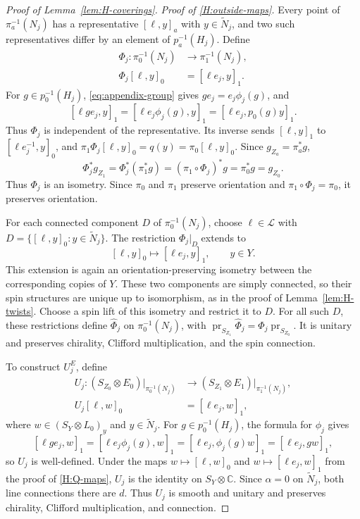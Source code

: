 \documentclass[12pt,reqno]{amsart}
\numberwithin{equation}{section}
\theoremstyle{definition}
\begin{document}
\begin{proof}[Proof of Lemma~\ref{lem:H-coverings}]
\emph{Proof of \ref{H:outside-maps}.}
Every point of $\pi_a^{-1}(N_j)$ has a representative
$[\ell,y]_a$ with $y\in\widetilde N_j$, and two such
representatives differ by an element of $p_a^{-1}(H_j)$.
Define
\begin{equation}\label{eq:appendix-exterior-maps}
\begin{aligned}
 \Phi_j:\pi_0^{-1}(N_j)&\longrightarrow\pi_1^{-1}(N_j),\\
 \Phi_j[\ell,y]_0&=[\ell e_j,y]_1.
\end{aligned}
\end{equation}
For $g\in p_0^{-1}(H_j)$, \eqref{eq:appendix-group} gives
$ge_j=e_j\phi_j(g)$, and
\[
 [\ell ge_j,y]_1
 =[\ell e_j\phi_j(g),y]_1
 =[\ell e_j,p_0(g)y]_1.
\]
Thus $\Phi_j$ is independent of the representative. Its inverse
sends $[\ell,y]_1$ to $[\ell e_j^{-1},y]_0$, and
$\pi_1\Phi_j[\ell,y]_0=q(y)=\pi_0[\ell,y]_0$.
Since $g_{Z_a}=\pi_a^*g$,
\[
 \Phi_j^*g_{Z_1}
 =\Phi_j^*(\pi_1^*g)
 =(\pi_1\circ\Phi_j)^*g
 =\pi_0^*g=g_{Z_0}.
\]
Thus $\Phi_j$ is an isometry. Since $\pi_0$ and $\pi_1$ preserve
orientation and $\pi_1\circ\Phi_j=\pi_0$, it preserves orientation.

For each connected component $D$ of $\pi_0^{-1}(N_j)$, choose
$\ell\in\mathcal L$ with
$D=\{[\ell,y]_0:y\in\widetilde N_j\}$.
The restriction $\Phi_j|_D$ extends to
\[
 [\ell,y]_0\longmapsto[\ell e_j,y]_1,\qquad y\in Y.
\]
This extension is again an orientation-preserving isometry between
the corresponding copies of $Y$.
These two components are simply connected, so their spin
structures are unique up to isomorphism, as in the proof of
Lemma~\ref{lem:H-twists}. Choose a spin lift of this isometry
and restrict it to $D$. For all such $D$, these restrictions define
$\widehat\Phi_j$ on $\pi_0^{-1}(N_j)$, with
$\operatorname{pr}_{S_{Z_1}}\widehat\Phi_j
=\Phi_j\operatorname{pr}_{S_{Z_0}}$.
It is unitary and preserves chirality, Clifford multiplication,
and the spin connection.

To construct $U_j^E$, define
\[
\begin{aligned}
 U_j:(S_{Z_0}\otimes E_0)|_{\pi_0^{-1}(N_j)}
 &\longrightarrow(S_{Z_1}\otimes E_1)|_{\pi_1^{-1}(N_j)},\\
 U_j[\ell,w]_0&=[\ell e_j,w]_1,
\end{aligned}
\]
where $w\in(S_Y\otimes L_0)_y$ and $y\in\widetilde N_j$.
For $g\in p_0^{-1}(H_j)$, the formula for $\phi_j$ gives
\[
 [\ell ge_j,w]_1
 =[\ell e_j\phi_j(g),w]_1
 =[\ell e_j,\phi_j(g)w]_1
 =[\ell e_j,gw]_1,
\]
so $U_j$ is well-defined. Under the maps
$w\mapsto[\ell,w]_0$ and $w\mapsto[\ell e_j,w]_1$
from the proof of \ref{H:Q-maps}, $U_j$ is the identity on
$S_Y\otimes\mathbb C$. Since $\alpha=0$ on $\widetilde N_j$,
both line connections there are $d$. Thus $U_j$ is smooth
and unitary and preserves chirality, Clifford multiplication,
and connection.


\end{proof}
\end{document}
